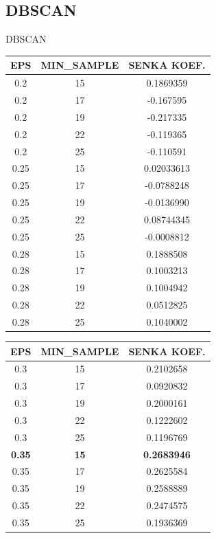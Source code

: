 \documentclass[12pt]{beamer}
\begin{document}
\subsection{DBSCAN}
\begin{frame}{DBSCAN}
\begin{multicols}{2}

\begin{table}
\scriptsize
\begin{tabular}{c|c|c}
EPS & MIN\_SAMPLE & SENKA KOEF. \\
\hline
\hline

0.2 & 15 & 0.1869359\\
0.2 & 17 & -0.167595\\
0.2 & 19 & -0.217335\\
0.2 & 22 & -0.119365\\
0.2 & 25 & -0.110591\\

0.25 & 15 & 0.02033613\\
0.25 & 17 & -0.0788248\\
0.25 & 19 & -0.0136990\\
0.25 & 22 & 0.08744345\\
0.25 & 25 & -0.0008812\\

0.28 & 15 & 0.1888508\\
0.28 & 17 & 0.1003213\\
0.28 & 19 & 0.1004942\\
0.28 & 22 & 0.0512825\\
0.28 & 25 & 0.1040002\\
\end{tabular}
\end{table}


\begin{table}
\scriptsize
\begin{tabular}{c|c|c}
EPS & MIN\_SAMPLE & SENKA KOEF. \\
\hline
\hline

0.3 & 15 & 0.2102658\\
0.3 & 17 & 0.0920832\\
0.3 & 19 & 0.2000161\\
0.3 & 22 & 0.1222602\\
0.3 & 25 & 0.1196769\\


\textbf{0.35} & \textbf{15} & \textbf{0.2683946}\\
0.35 & 17 & 0.2625584\\
0.35 & 19 & 0.2588889\\
0.35 & 22 & 0.2474575\\
0.35 & 25 & 0.1936369\\

\end{tabular}
\end{table}
\end{multicols}
\end{frame}
\end{document}
